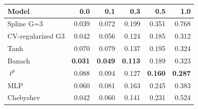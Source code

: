 \begin{tabular}{lrrrrr}
\toprule
Model & 0.0 & 0.1 & 0.3 & 0.5 & 1.0 \\
\midrule
Spline G=3 & 0.039 & 0.072 & 0.199 & 0.351 & 0.768 \\
CV-regularized G3 & 0.042 & 0.056 & 0.124 & 0.185 & 0.312 \\
Tanh & 0.070 & 0.079 & 0.137 & 0.195 & 0.324 \\
Banach & \textbf{0.031} & \textbf{0.049} & \textbf{0.113} & 0.189 & 0.323 \\
$\ell^p$ & 0.088 & 0.094 & 0.127 & \textbf{0.160} & \textbf{0.287} \\
MLP & 0.060 & 0.081 & 0.163 & 0.245 & 0.383 \\
Chebyshev & 0.042 & 0.060 & 0.141 & 0.231 & 0.524 \\
\bottomrule
\end{tabular}
